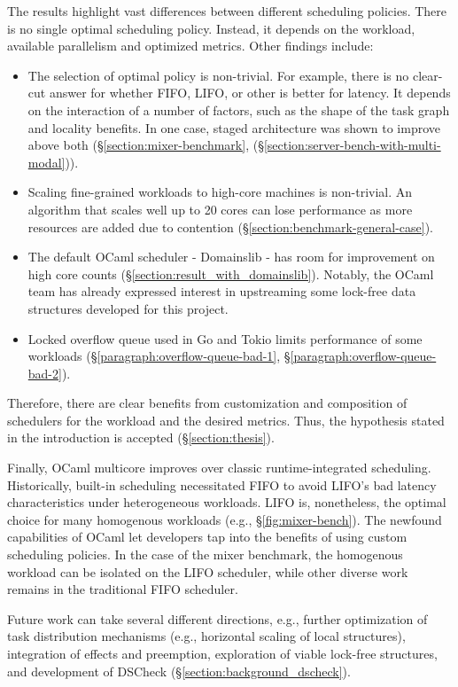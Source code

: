 \documentclass[12pt,a4paper,twoside]{report}
\begin{document}
The results highlight vast differences between different scheduling policies. There is no single optimal scheduling policy. Instead, it depends on the workload, available parallelism and optimized metrics. Other findings include: 
\begin{itemize}
    \item The selection of optimal policy is non-trivial. For example, there is no clear-cut answer for whether FIFO, LIFO, or other is better for latency. It depends on the interaction of a number of factors, such as the shape of the task graph and locality benefits. In one case, staged architecture was shown to improve above both (\S\ref{section:mixer-benchmark}, (\S\ref{section:server-bench-with-multi-modal})).
    \item Scaling fine-grained workloads to high-core machines is non-trivial. An algorithm that scales well up to 20 cores can lose performance as more resources are added due to contention (\S\ref{section:benchmark-general-case}).
    \item The default OCaml scheduler - Domainslib \cite{ocamlmul59:online} - has room for improvement on high core counts (\S\ref{section:result_with_domainslib}). Notably, the OCaml team has already expressed interest in upstreaming some lock-free data structures developed for this project.
    \item Locked overflow queue used in Go and Tokio limits performance of some workloads (\S\ref{paragraph:overflow-queue-bad-1}, \S\ref{paragraph:overflow-queue-bad-2}).
\end{itemize}
Therefore, there are clear benefits from customization and composition of schedulers for the workload and the desired metrics. Thus, the hypothesis stated in the introduction is accepted (\S\ref{section:thesis}). 

Finally, OCaml multicore improves over classic runtime-integrated scheduling. Historically, built-in scheduling necessitated FIFO to avoid LIFO's bad latency characteristics under heterogeneous workloads. LIFO is, nonetheless, the optimal choice for many homogenous workloads (e.g., \S\ref{fig:mixer-bench}). The newfound capabilities of OCaml let developers tap into the benefits of using custom scheduling policies. In the case of the mixer benchmark, the homogenous workload can be isolated on the LIFO scheduler, while other diverse work remains in the traditional FIFO scheduler.

Future work can take several different directions, e.g., further optimization of task distribution mechanisms (e.g., horizontal scaling of local structures), integration of effects and preemption, exploration of viable lock-free structures, and development of DSCheck (\S\ref{section:background_dscheck}). 
\end{document}
